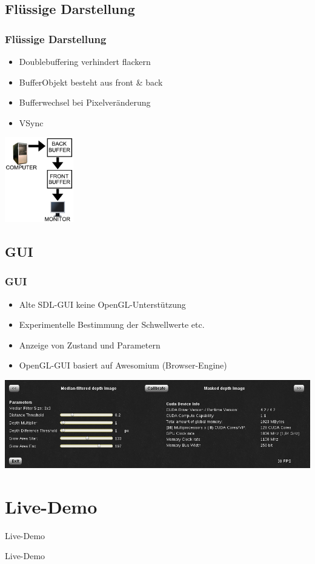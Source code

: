 \documentclass[compress]{beamer}
\begin{document}
\subsection{Flüssige Darstellung}
\begin{frame}
\frametitle{Flüssige Darstellung}
\begin{itemize}
\item Doublebuffering verhindert flackern
\item BufferObjekt besteht aus front \& back
\item Bufferwechsel bei Pixelveränderung
\item VSync
\end{itemize}
\hspace*{4cm}\includegraphics[width=3cm]{double.png}
\end{frame}

\subsection{GUI}
\begin{frame}
\frametitle{GUI}
\begin{itemize}
\item Alte SDL-GUI keine OpenGL-Unterstützung
\item Experimentelle Bestimmung der Schwellwerte etc.
\item Anzeige von Zustand und Parametern
\item OpenGL-GUI basiert auf Awesomium (Browser-Engine)
\end{itemize}
\includegraphics[width=\textwidth]{gui.png}
\end{frame}

\section{Live-Demo}
\begin{frame}{Live-Demo}
\Huge
\centerline{Live-Demo}
\end{frame}
\end{document}
